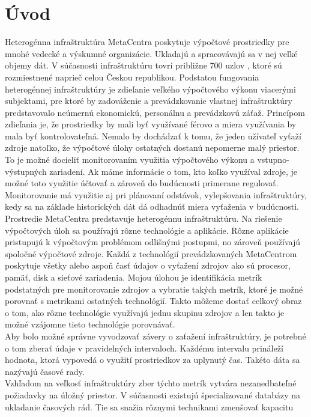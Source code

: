 \documentclass[printed,11pt,twoside,color,cover,table]{fithesis3}
\begin{document}
\chapter{Úvod}
Heterogénna infraštruktúra MetaCentra poskytuje výpočtové prostriedky pre mnohé vedecké a výskumné organizácie. Ukladajú a spracovávajú sa v nej veľké objemy dát. V súčasnosti infraštruktúru
tovrí približne 700 uzlov \cite{metacentrum_size}, ktoré sú rozmiestnené naprieč celou
Českou republikou. Podstatou fungovania heterogénnej infraštruktúry je zdieľanie veľkého výpočtového výkonu viacerými subjektami, pre ktoré by zadováženie a prevádzkovanie vlastnej infraštruktúry predstavovalo neúmernú 
ekonomickú, personálnu a prevádzkovú záťaž. Princípom zdieľania je, že prostriedky by mali byť využívané férovo a miera využívania by
mala byť kontrolovateľná. Nemalo by dochádzať k tomu, že jeden užívateľ vyťaží zdroje natoľko, že 
výpočtové úlohy ostatných dostanú nepomerne malý priestor. To je možné docieliť monitorovaním využitia výpočtového výkonu a vstupno-výstupných zariadení. Ak máme informácie o tom, kto koľko využíval zdroje, 
je možné toto využitie účtovať a zároveň do budúcnosti primerane regulovať. Monitorovanie má využitie aj pri plánovaní
odstávok, vylepšovania infraštruktúry, kedy sa na základe historických dát dá odhadnúť miera vyťaženia v budúcnosti.
\\Prostredie MetaCentra predstavuje heterogénnu infraštruktúru. Na riešenie výpočtových úloh sa používajú rôzne technológie a aplikácie. 
Rôzne aplikácie pristupujú k výpočtovým problémom odlišnými postupmi,
no zároveň používajú spoločné výpočtové zdroje. Každá z technológií prevádzkovaných MetaCentrom poskytuje všetky alebo aspoň časť údajov 
o vyťažení zdrojov ako sú procesor, pamäť, disk a sieťové zariadenia. Mojou úlohou je identifikácia metrík podstatných pre monitorovanie 
zdrojov a vybratie takých metrík, ktoré je možné porovnať s metrikami ostatných technológií. Takto môžeme dostať celkový obraz o tom, ako rôzne technológie využívajú jednu skupinu zdrojov a len takto je možné vzájomne tieto technológie 
porovnávať.
\\Aby bolo možné správne vyvodzovať závery o zaťažení infraštruktúry, je potrebné o tom zberať údaje v pravidelných intervaloch. Každému intervalu 
prináleží hodnota, ktorá vypovedá o využití prostriedkov za uplynutý čas. Takéto dáta sa nazývajú časové rady.
\\Vzhľadom na veľkosť infraštruktúry zber týchto metrík vytvára nezanedbateľné požiadavky na úložný priestor. 
V súčasnosti existujú špecializované databázy na ukladanie časových rád. Tie sa snažia rôznymi technikami zmenšovať kapacitu
\end{document}
